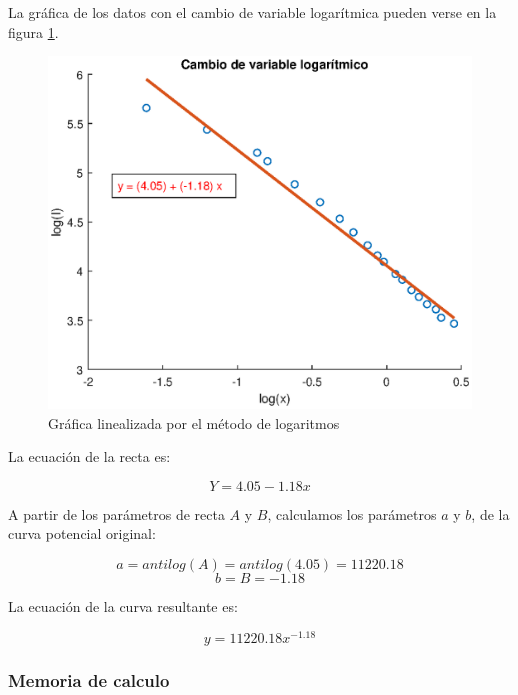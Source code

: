 \documentclass[letter,11pt]{article}
\begin{document}
La gráfica de los datos con el cambio de variable logarítmica pueden verse en la
figura \ref{practica31_2}.

\begin{figure}[!h]
\centering
\includegraphics[scale=1.00]{eps/3.1.2.eps}
\caption{Gráfica linealizada por el método de logaritmos}
\label{practica31_2}
\end{figure}

La ecuación de la recta es:

\begin{equation}
    Y = 4.05 - 1.18 x
\end{equation}

A partir de los parámetros de recta $A$ y $B$, calculamos los parámetros $a$ y
$b$, de la curva potencial original:

\begin{equation*}
    a = antilog(A) = antilog(4.05) = 11220.18
\end{equation*}
\begin{equation*}
    b = B = -1.18
\end{equation*}

La ecuación de la curva resultante es:

\begin{equation}
    y = 11220.18 x^{-1.18}
\end{equation}

\subsubsection{Memoria de calculo}
\end{document}
